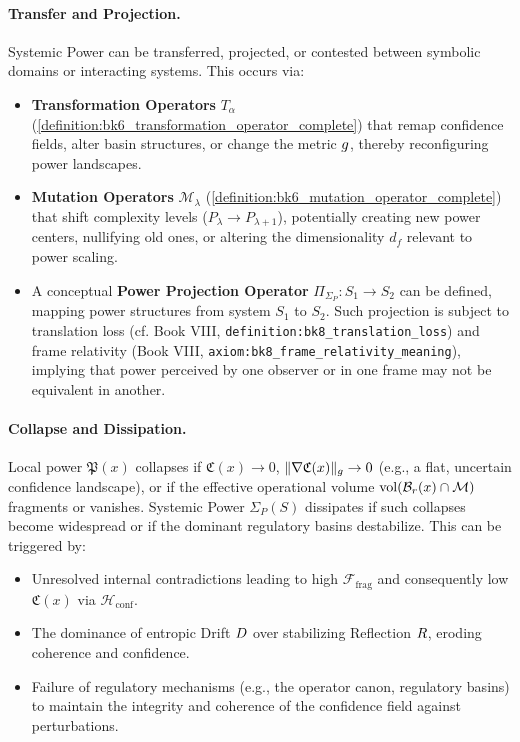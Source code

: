 \paragraph{Transfer and Projection.} Systemic Power can be transferred, projected, or contested between symbolic domains or interacting systems. This occurs via:
\begin{itemize}
    \item \textbf{Transformation Operators} \(T_\alpha\) (\ref{definition:bk6_transformation_operator_complete}) that remap confidence fields, alter basin structures, or change the metric \(g\), thereby reconfiguring power landscapes.
    \item \textbf{Mutation Operators} \(\mathcal{M}_\lambda\) (\ref{definition:bk6_mutation_operator_complete}) that shift complexity levels (\(P_\lambda \to P_{\lambda+1}\)), potentially creating new power centers, nullifying old ones, or altering the dimensionality \(d_f\) relevant to power scaling.
    \item A conceptual \textbf{Power Projection Operator} \(\Pi_{\Sigma_P} : S_1 \to S_2\) can be defined, mapping power structures from system \(S_1\) to \(S_2\). Such projection is subject to translation loss (cf. Book VIII, \texttt{definition:bk8\_translation\_loss}) and frame relativity (Book VIII, \texttt{axiom:bk8\_frame\_relativity\_meaning}), implying that power perceived by one observer or in one frame may not be equivalent in another.
\end{itemize}

\paragraph{Collapse and Dissipation.} Local power \(\mathfrak{P}(x)\) collapses if \(\mathfrak{C}(x) \to 0\), \(\|\nabla \mathfrak{C}(x)\|_{g} \to 0\) (e.g., a flat, uncertain confidence landscape), or if the effective operational volume \(\text{vol}(\mathcal{B}_r(x) \cap \mathcal{M})\) fragments or vanishes. Systemic Power \(\Sigma_P(S)\) dissipates if such collapses become widespread or if the dominant regulatory basins destabilize. This can be triggered by:
\begin{itemize}
    \item Unresolved internal contradictions leading to high \(\mathcal{F}_{\text{frag}}\) and consequently low \(\mathfrak{C}(x)\) via \(\mathcal{H}_{\text{conf}}\).
    \item The dominance of entropic Drift \(D\) over stabilizing Reflection \(R\), eroding coherence and confidence.
    \item Failure of regulatory mechanisms (e.g., the operator canon, regulatory basins) to maintain the integrity and coherence of the confidence field against perturbations.
\end{itemize}

